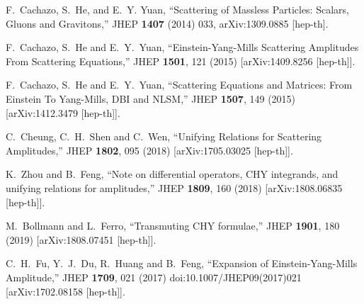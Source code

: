 \documentclass[preprint,showpacs,onecolumn,nofootinbib]{revtex4}
\begin{document}
\begin{thebibliography}{}
F.~Cachazo, S.~He, and E.~Y. Yuan,
``{Scattering of Massless Particles: Scalars, Gluons and Gravitons},''
  { JHEP} {\bf 1407} (2014)
   033,
 arXiv:1309.0885 [hep-th].

  F.~Cachazo, S.~He and E.~Y.~Yuan,
  ``Einstein-Yang-Mills Scattering Amplitudes From Scattering Equations,''
  JHEP {\bf 1501}, 121 (2015)
  [arXiv:1409.8256 [hep-th]].


  F.~Cachazo, S.~He and E.~Y.~Yuan,
  ``Scattering Equations and Matrices: From Einstein To Yang-Mills, DBI and NLSM,''
  JHEP {\bf 1507}, 149 (2015)
  [arXiv:1412.3479 [hep-th]].


  C.~Cheung, C.~H.~Shen and C.~Wen,
  ``Unifying Relations for Scattering Amplitudes,''
  JHEP {\bf 1802}, 095 (2018)
  [arXiv:1705.03025 [hep-th]].

  K.~Zhou and B.~Feng,
  ``Note on differential operators, CHY integrands, and unifying relations for amplitudes,''
  JHEP {\bf 1809}, 160 (2018)
  [arXiv:1808.06835 [hep-th]].

  M.~Bollmann and L.~Ferro,
  ``Transmuting CHY formulae,''
  JHEP {\bf 1901}, 180 (2019)
  [arXiv:1808.07451 [hep-th]].




  C.~H.~Fu, Y.~J.~Du, R.~Huang and B.~Feng,
  ``Expansion of Einstein-Yang-Mills Amplitude,''
  JHEP {\bf 1709}, 021 (2017)
  doi:10.1007/JHEP09(2017)021
  [arXiv:1702.08158 [hep-th]].



\end{thebibliography}
\end{document}
